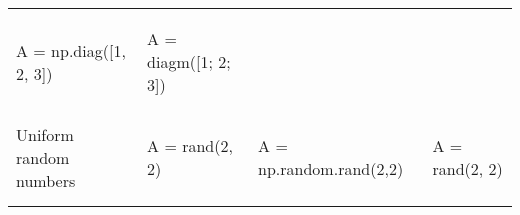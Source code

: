 \documentclass[10pt, landscape]{article}
\newenvironment{Shaded}{}{}
\newcommand{\DecValTok}[1]{\textcolor[rgb]{0.25,0.63,0.44}{{#1}}}
\newcommand{\FloatTok}[1]{\textcolor[rgb]{0.25,0.63,0.44}{{#1}}}
\newcommand{\OperatorTok}[1]{\textcolor[rgb]{0.40,0.40,0.40}{{#1}}}
\newcommand{\NormalTok}[1]{{#1}}
\begin{document}
\begin{multicols*}{2}
\begin{tabular}[ ]{@{}llll@{}}
\begin{minipage}[t]{0.25\columnwidth}
\begin{Shaded}
\begin{Highlighting}[]
\NormalTok{A }\OperatorTok{=} \NormalTok{np.diag([}\DecValTok{1}\NormalTok{, }\DecValTok{2}\NormalTok{, }\DecValTok{3}\NormalTok{])}
\end{Highlighting}
\end{Shaded}
\strut
\end{minipage} & \begin{minipage}[t]{0.20\columnwidth}\raggedright\strut
\begin{Shaded}
\begin{Highlighting}[]
\NormalTok{A = diagm([}\FloatTok{1}\NormalTok{; }\FloatTok{2}\NormalTok{; }\FloatTok{3}\NormalTok{])}
\end{Highlighting}
\end{Shaded}
\strut
\end{minipage}\tabularnewline
\begin{minipage}[t]{0.24\columnwidth}\raggedright\strut
Uniform random numbers\strut
\end{minipage} & \begin{minipage}[t]{0.20\columnwidth}\raggedright\strut
\begin{Shaded}
\begin{Highlighting}[]
\NormalTok{A = rand(}\FloatTok{2}\NormalTok{, }\FloatTok{2}\NormalTok{)}
\end{Highlighting}
\end{Shaded}
\strut
\end{minipage} & \begin{minipage}[t]{0.25\columnwidth}\raggedright\strut
\begin{Shaded}
\begin{Highlighting}[]
\NormalTok{A }\OperatorTok{=} \NormalTok{np.random.rand(}\DecValTok{2}\NormalTok{,}\DecValTok{2}\NormalTok{)}
\end{Highlighting}
\end{Shaded}
\strut
\end{minipage} & \begin{minipage}[t]{0.20\columnwidth}\raggedright\strut
\begin{Shaded}
\begin{Highlighting}[]
\NormalTok{A = rand(}\FloatTok{2}\NormalTok{, }\FloatTok{2}\NormalTok{)}
\end{Highlighting}
\end{Shaded}
\strut
\end{minipage}\tabularnewline
\begin{minipage}[t]{0.24\columnwidth}\raggedright\strut

\end{minipage}
\end{tabular}
\end{multicols*}
\end{document}
